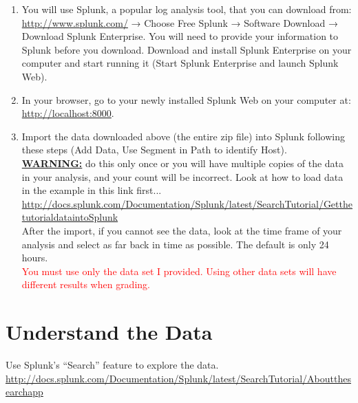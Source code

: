 \documentclass[a4paper, 10pt]{article}
\begin{document}
\begin{enumerate}
	\item You will use Splunk, a popular log analysis tool, that you can download from: \\
	      \href{http://www.splunk.com/}{http://www.splunk.com/} → Choose Free Splunk → Software Download → Download Splunk Enterprise.
	      You will need to provide your information to Splunk before you download.
	      Download and install Splunk Enterprise on your computer and start running it
	      (Start Splunk Enterprise and launch Splunk Web).
	\item In your browser, go to your newly installed Splunk Web on your computer at:
	      \href{http://localhost:8000}{http://localhost:8000}.
	\item Import the data downloaded above (the entire zip file)
	      into Splunk following these steps (Add Data, Use Segment in Path to identify Host). \\
	      \textbf{\underline{WARNING:}} do this only once or you will have multiple copies of the data in your analysis,
	      and your count will be incorrect.
	      Look at how to load data in the example in this link first... \\
	      \small{\href{http://docs.splunk.com/Documentation/Splunk/latest/SearchTutorial/GetthetutorialdataintoSplunk}{http://docs.splunk.com/Documentation/Splunk/latest/SearchTutorial/GetthetutorialdataintoSplunk}} \\
	      After the import, if you cannot see the data, look at the time frame of your analysis and select as far back in time as possible.
	      The default is only 24 hours. \\
	      \textcolor{red}{You must use only the data set I provided.
		      Using other data sets will have different results when grading.}
\end{enumerate}

\section*{Understand the Data}

Use Splunk's ``Search'' feature to explore the data. \\
\href{http://docs.splunk.com/Documentation/Splunk/latest/SearchTutorial/Aboutthesearchapp}{http://docs.splunk.com/Documentation/Splunk/latest/SearchTutorial/Aboutthesearchapp}
\end{document}
